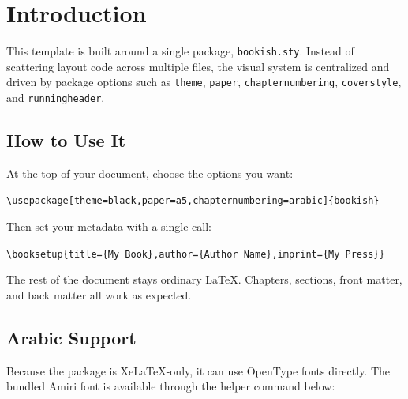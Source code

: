 \chapter{Introduction}

This template is built around a single package, \texttt{bookish.sty}. Instead
of scattering layout code across multiple files, the visual system is
centralized and driven by package options such as \texttt{theme},
\texttt{paper}, \texttt{chapternumbering}, \texttt{coverstyle}, and
\texttt{runningheader}.

\section{How to Use It}

At the top of your document, choose the options you want:

\begin{bookcallout}
\verb|\usepackage[theme=black,paper=a5,chapternumbering=arabic]{bookish}|
\end{bookcallout}

Then set your metadata with a single call:

\begin{bookcallout}[Metadata]
\verb|\booksetup{title={My Book},author={Author Name},imprint={My Press}}|
\end{bookcallout}

The rest of the document stays ordinary LaTeX. Chapters, sections, front
matter, and back matter all work as expected.

\section{Arabic Support}

Because the package is XeLaTeX-only, it can use OpenType fonts directly. The
bundled Amiri font is available through the helper command below:

\begin{center}
\end{center}
